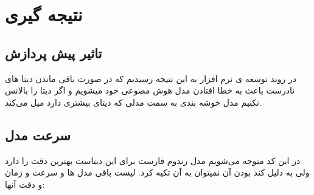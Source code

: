 \chapter{نتیجه گیری}

\section{تاثیر پیش پردازش}

در روند توسعه ی نرم افزار به این نتیجه رسیدیم که در صورت باقی ماندن دیتا های نادرست باعث به خطا افتادن مدل هوش مصوعی خود میشویم و اگر دیتا را بالانس نکنیم 
مدل خوشه بندی به سمت مدلی که دیتای بیشتری دارد میل می‌کند.

\section{سرعت مدل}
در این کد متوجه می‌شویم مدل رندوم فارست برای این دیتاست بهترین دقت را دارد ولی به دلیل کند بودن آن نمیتوان به آن تکیه کرد.
لیست باقی مدل ها و سرعت و زمان و دقت آنها:

